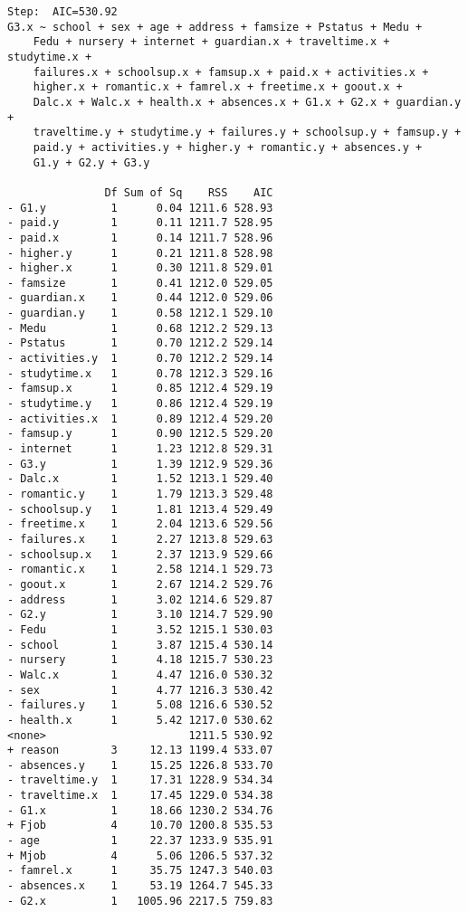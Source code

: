 \documentclass[11pt]{article}
\begin{document}
\begin{enumerate}
\begin{verbatim}
Step:  AIC=530.92
G3.x ~ school + sex + age + address + famsize + Pstatus + Medu + 
    Fedu + nursery + internet + guardian.x + traveltime.x + studytime.x + 
    failures.x + schoolsup.x + famsup.x + paid.x + activities.x + 
    higher.x + romantic.x + famrel.x + freetime.x + goout.x + 
    Dalc.x + Walc.x + health.x + absences.x + G1.x + G2.x + guardian.y + 
    traveltime.y + studytime.y + failures.y + schoolsup.y + famsup.y + 
    paid.y + activities.y + higher.y + romantic.y + absences.y + 
    G1.y + G2.y + G3.y

               Df Sum of Sq    RSS    AIC
- G1.y          1      0.04 1211.6 528.93
- paid.y        1      0.11 1211.7 528.95
- paid.x        1      0.14 1211.7 528.96
- higher.y      1      0.21 1211.8 528.98
- higher.x      1      0.30 1211.8 529.01
- famsize       1      0.41 1212.0 529.05
- guardian.x    1      0.44 1212.0 529.06
- guardian.y    1      0.58 1212.1 529.10
- Medu          1      0.68 1212.2 529.13
- Pstatus       1      0.70 1212.2 529.14
- activities.y  1      0.70 1212.2 529.14
- studytime.x   1      0.78 1212.3 529.16
- famsup.x      1      0.85 1212.4 529.19
- studytime.y   1      0.86 1212.4 529.19
- activities.x  1      0.89 1212.4 529.20
- famsup.y      1      0.90 1212.5 529.20
- internet      1      1.23 1212.8 529.31
- G3.y          1      1.39 1212.9 529.36
- Dalc.x        1      1.52 1213.1 529.40
- romantic.y    1      1.79 1213.3 529.48
- schoolsup.y   1      1.81 1213.4 529.49
- freetime.x    1      2.04 1213.6 529.56
- failures.x    1      2.27 1213.8 529.63
- schoolsup.x   1      2.37 1213.9 529.66
- romantic.x    1      2.58 1214.1 529.73
- goout.x       1      2.67 1214.2 529.76
- address       1      3.02 1214.6 529.87
- G2.y          1      3.10 1214.7 529.90
- Fedu          1      3.52 1215.1 530.03
- school        1      3.87 1215.4 530.14
- nursery       1      4.18 1215.7 530.23
- Walc.x        1      4.47 1216.0 530.32
- sex           1      4.77 1216.3 530.42
- failures.y    1      5.08 1216.6 530.52
- health.x      1      5.42 1217.0 530.62
<none>                      1211.5 530.92
+ reason        3     12.13 1199.4 533.07
- absences.y    1     15.25 1226.8 533.70
- traveltime.y  1     17.31 1228.9 534.34
- traveltime.x  1     17.45 1229.0 534.38
- G1.x          1     18.66 1230.2 534.76
+ Fjob          4     10.70 1200.8 535.53
- age           1     22.37 1233.9 535.91
+ Mjob          4      5.06 1206.5 537.32
- famrel.x      1     35.75 1247.3 540.03
- absences.x    1     53.19 1264.7 545.33
- G2.x          1   1005.96 2217.5 759.83


\end{verbatim}
\end{enumerate}
\end{document}
